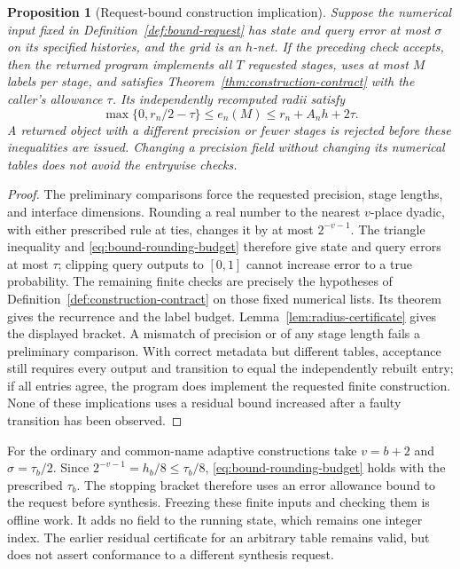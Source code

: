 \documentclass[11pt]{amsart}
\newtheorem{proposition}[theorem]{Proposition}
\theoremstyle{definition}\newtheorem{definition}[theorem]{Definition}
\theoremstyle{remark}\newtheorem{remark}[theorem]{Remark}
\begin{document}
\begin{proposition}[Request-bound construction implication]
\label{prop:request-conformance}
Suppose the numerical input fixed in Definition~\ref{def:bound-request}
has state and query error at most $\sigma$ on its specified histories,
and the grid is an $h$-net. If the preceding check accepts, then the
returned program implements all $T$ requested stages, uses at most $M$
labels per stage, and satisfies Theorem~\ref{thm:construction-contract}
with the caller's allowance $\tau$. Its independently recomputed radii
satisfy
\[
 \max\{0,r_n/2-\tau\}\le e_n(M)
      \le r_n+A_nh+2\tau.
\]
A returned object with a different precision or fewer stages is rejected
before these inequalities are issued. Changing a precision field without
changing its numerical tables does not avoid the entrywise checks.
\end{proposition}
\begin{proof}
The preliminary comparisons force the requested precision, stage lengths,
and interface dimensions. Rounding a real number to the nearest
$v$-place dyadic, with either prescribed rule at ties, changes it by at
most $2^{-v-1}$. The triangle inequality and
\eqref{eq:bound-rounding-budget} therefore give state and query errors
at most $\tau$; clipping query outputs to $[0,1]$ cannot increase
error to a true probability. The remaining finite checks are precisely
the hypotheses of Definition~\ref{def:construction-contract} on those
fixed numerical lists. Its theorem gives the recurrence and the label
budget. Lemma~\ref{lem:radius-certificate} gives the displayed bracket.
A mismatch of precision or of any stage length fails a preliminary
comparison. With correct metadata but different tables, acceptance still
requires every output and transition to equal the independently rebuilt
entry; if all entries agree, the program does implement the requested
finite construction. None of these implications uses a residual bound
increased after a faulty transition has been observed.
\end{proof}

For the ordinary and common-name adaptive constructions take $v=b+2$
and $\sigma=\tau_b/2$. Since $2^{-v-1}=h_b/8\le\tau_b/8$,
\eqref{eq:bound-rounding-budget} holds with the prescribed $\tau_b$.
The stopping bracket therefore uses an error allowance bound to the
request before synthesis. Freezing these finite inputs and checking them
is offline work. It adds no field to the running state, which remains
one integer index. The earlier residual certificate for an arbitrary
table remains valid, but does not assert conformance to a different
synthesis request.
\end{document}
